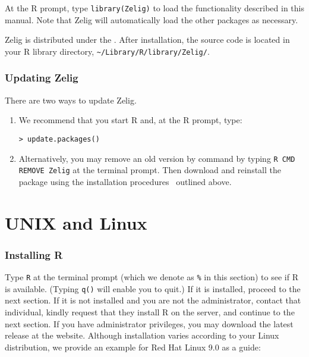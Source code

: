 At the R prompt, type \texttt{library(Zelig)} to load the
functionality described in this manual.  Note that Zelig will
automatically load the other packages as necessary.
  
Zelig is distributed under the .  After
installation, the source code is located in your R library directory,
{\tt \~{}/Library/R/library/Zelig/}.

\subsubsection{Updating Zelig}
  
There are two ways to update Zelig.
\begin{enumerate}

\item We recommend that you start R and, at the R prompt, type:
\begin{verbatim}
> update.packages()
\end{verbatim}
  
\item Alternatively, you may remove an old version by command by
  typing {\tt R CMD REMOVE Zelig} at the terminal prompt.  Then
  download and reinstall the package using the installation
  procedures~ outlined above.
\end{enumerate}

\section{UNIX and Linux}\label{ss:unix}

\subsubsection{Installing R}
Type {\tt R} at the terminal prompt (which we denote as {\tt \%} in
this section) to see if R is available. (Typing \texttt{q()} will
enable you to quit.)  If it is installed, proceed to the next section.
If it is not installed and you are not the administrator, contact that
individual, kindly request that they install R on the server, and
continue to the next section. If you have administrator privileges,
you may download the latest release at the
 website.  Although
installation varies according to your Linux distribution, we provide
an example for Red Hat Linux 9.0 as a guide:

